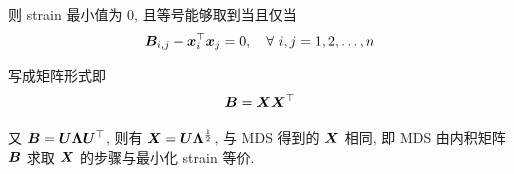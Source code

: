\documentclass{article}
\begin{document}
则 strain 最小值为 0, 且等号能够取到当且仅当
\begin{equation}
  \bm{B}_{i,j} - \bm{x}_i^\top\bm{x}_j=0,\quad\forall~i,j=1,2,\dots,n
\end{equation}

写成矩阵形式即
\begin{equation}
  \bm{B}=\bm{X}\bm{X}^\top
\end{equation}

又 $\bm{B}=\bm{U}\bm{\Lambda}\bm{U}^\top$, 则有 $\bm{X}=\bm{U}\bm{\Lambda}^{\frac{1}{2}}$, 与 MDS 得到的 $\bm{X}$ 相同, 即 MDS 由内积矩阵 $\bm{B}$ 求取 $\bm{X}$ 的步骤与最小化 strain 等价.



\end{document}
